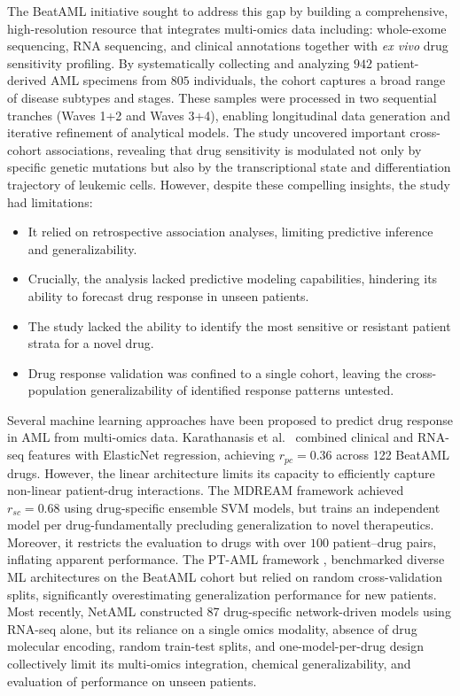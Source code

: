 \documentclass[pdflatex,sn-mathphys-num]{sn-jnl}
\theoremstyle{thmstyleone}
\theoremstyle{thmstyletwo}
\theoremstyle{thmstylethree}
\begin{document}
The BeatAML initiative \cite{bottomly2022integrative} sought to address this gap by building a comprehensive, high-resolution resource that integrates multi-omics data including: whole-exome sequencing, RNA sequencing, and clinical annotations together with \textit{ex vivo} drug sensitivity profiling. By systematically collecting and analyzing $942$ patient-derived AML specimens from $805$ individuals, the cohort captures a broad range of disease subtypes and stages. These samples were processed in two sequential tranches (Waves 1+2 and Waves 3+4), enabling longitudinal data generation and iterative refinement of analytical models. The study uncovered important cross-cohort associations, revealing that drug sensitivity is modulated not only by specific genetic mutations but also by the transcriptional state and differentiation trajectory of leukemic cells. However, despite these compelling insights, the study \cite{bottomly2022integrative} had limitations:
\begin{itemize}
    \item It relied on retrospective association analyses, limiting predictive inference and generalizability.
    \item Crucially, the analysis lacked predictive modeling capabilities, hindering its ability to forecast drug response in unseen patients.
    \item The study lacked the ability to identify the most sensitive or resistant patient strata for a novel drug.
    \item Drug response validation was confined to a single cohort, leaving the cross-population generalizability of identified response patterns untested.
\end{itemize}
Several machine learning approaches have been proposed to predict drug response in AML from multi-omics data. Karathanasis et al.\ \cite{karathanasis2024machine} combined clinical and RNA-seq features with ElasticNet regression, achieving $r_{pc} = 0.36$ across 122 BeatAML drugs. However, the linear architecture limits its capacity to efficiently capture non-linear patient-drug interactions. The MDREAM framework \cite{trac2023prediction} achieved $r_{sc} = 0.68$ using drug-specific ensemble SVM models, but trains an independent model per drug-fundamentally precluding generalization to novel therapeutics. Moreover, it restricts the evaluation to drugs with over $100$ patient–drug pairs, inflating apparent performance. The PT-AML framework \cite{jani2024pt}, benchmarked diverse ML architectures on the BeatAML cohort but relied on random cross-validation splits, significantly overestimating generalization performance for new patients. Most recently, NetAML \cite{wang2025netaml} constructed 87 drug-specific network-driven models using RNA-seq alone, but its reliance on a single omics modality, absence of drug molecular encoding, random train-test splits, and one-model-per-drug design collectively limit its multi-omics integration, chemical generalizability, and evaluation of performance on unseen patients.
\end{document}
